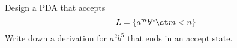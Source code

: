 Design a PDA that accepts
\[
L = \{ a^m b^{n} \st m < n \}
\]
Write down a derivation for $a^2 b^5$ that ends in an accept state.
